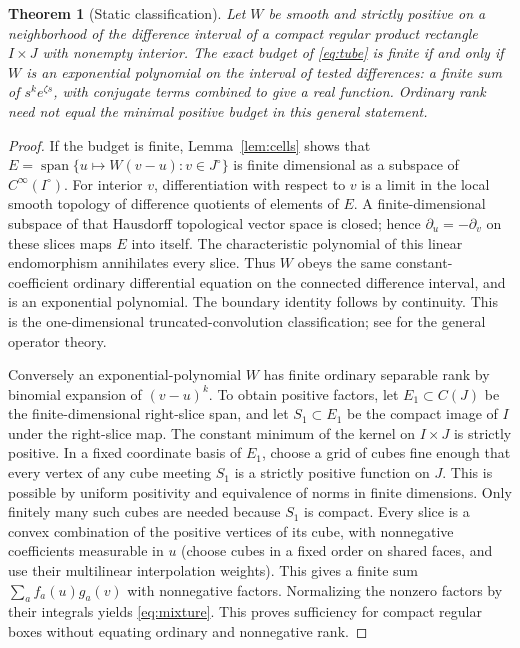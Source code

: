 \documentclass[11pt,letterpaper]{article}
\newtheorem{theorem}{Theorem}
\begin{document}
\begin{theorem}[Static classification]\label{th:static}
Let $W$ be smooth and strictly positive on a neighborhood of the difference interval of a compact regular product rectangle $I\times J$ with nonempty interior. The exact budget of \eqref{eq:tube} is finite if and only if $W$ is an exponential polynomial on the interval of tested differences: a finite sum of $s^k e^{\zeta s}$, with conjugate terms combined to give a real function. Ordinary rank need not equal the minimal positive budget in this general statement.
\end{theorem}
\begin{proof}
If the budget is finite, Lemma~\ref{lem:cells} shows that $E=\operatorname{span}\{u\mapsto W(v-u):v\in J^\circ\}$ is finite dimensional as a subspace of $C^\infty(I^\circ)$. For interior $v$, differentiation with respect to $v$ is a limit in the local smooth topology of difference quotients of elements of $E$. A finite-dimensional subspace of that Hausdorff topological vector space is closed; hence $\partial_u=-\partial_v$ on these slices maps $E$ into itself. The characteristic polynomial of this linear endomorphism annihilates every slice. Thus $W$ obeys the same constant-coefficient ordinary differential equation on the connected difference interval, and is an exponential polynomial. The boundary identity follows by continuity. This is the one-dimensional truncated-convolution classification; see \cite{AC} for the general operator theory.

Conversely an exponential-polynomial $W$ has finite ordinary separable rank by binomial expansion of $(v-u)^k$. To obtain positive factors, let $E_1\subset C(J)$ be the finite-dimensional right-slice span, and let $S_1\subset E_1$ be the compact image of $I$ under the right-slice map. The constant minimum of the kernel on $I\times J$ is strictly positive. In a fixed coordinate basis of $E_1$, choose a grid of cubes fine enough that every vertex of any cube meeting $S_1$ is a strictly positive function on $J$. This is possible by uniform positivity and equivalence of norms in finite dimensions. Only finitely many such cubes are needed because $S_1$ is compact. Every slice is a convex combination of the positive vertices of its cube, with nonnegative coefficients measurable in $u$ (choose cubes in a fixed order on shared faces, and use their multilinear interpolation weights). This gives a finite sum $\sum_a f_a(u)g_a(v)$ with nonnegative factors. Normalizing the nonzero factors by their integrals yields \eqref{eq:mixture}. This proves sufficiency for compact regular boxes without equating ordinary and nonnegative rank.
\end{proof}
\end{document}
